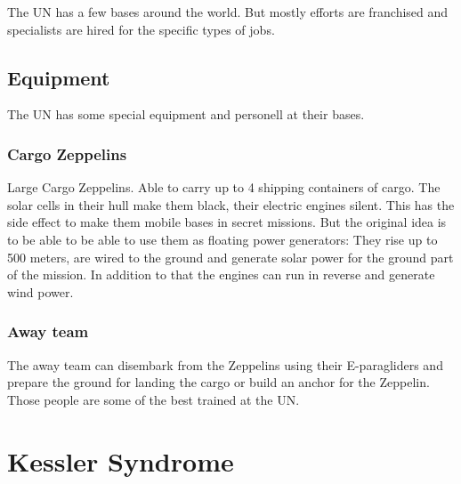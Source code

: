 The UN has a few bases around the world. But mostly efforts are franchised and specialists are hired for the specific types of jobs.

\subsection{Equipment}

The UN has some special equipment and personell at their bases.

\subsubsection{Cargo Zeppelins}
\label{sec: UN Cargo Zeppelins}
Large Cargo Zeppelins. Able to carry up to 4 shipping containers of cargo. The solar cells in their hull make them black, their electric engines silent. This has the side effect to make them mobile bases in secret missions. But the original idea is to be able to be able to use them as floating power generators: They rise up to 500 meters, are wired to the ground and generate solar power for the ground part of the mission. In addition to that the engines can run in reverse and generate wind power.

\subsubsection{Away team}
\label{sec: UN away team}
The away team can disembark from the Zeppelins using their E-paragliders and prepare the ground for landing the cargo or build an anchor for the Zeppelin. Those people are some of the best trained at the UN.

\section{Kessler Syndrome}
\label{sec: Kessler Syndrome}